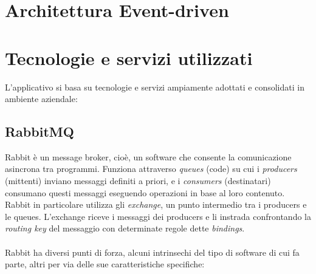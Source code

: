 \section{Architettura Event-driven}

\section{Tecnologie e servizi utilizzati}

L'applicativo si basa su tecnologie e servizi ampiamente adottati e consolidati in ambiente aziendale:

\subsection{RabbitMQ}
Rabbit \`e un message broker, cio\`e, un software che consente la comunicazione asincrona tra programmi.
Funziona attraverso \textit{queues} (code) su cui i \textit{producers} (mittenti) inviano messaggi definiti a priori,
e i \textit{consumers} (destinatari) consumano questi messaggi eseguendo operazioni in base al loro contenuto.
Rabbit in particolare utilizza gli \textit{exchange}, un punto intermedio tra i producers e le queues.
L'exchange riceve i messaggi dei producers e li instrada confrontando la \textit{routing key} del messaggio con determinate regole dette \textit{bindings}.\\\\
%
Rabbit ha diversi punti di forza, alcuni intrinsechi del tipo di software di cui fa parte, altri per via delle sue caratteristiche specifiche:\
